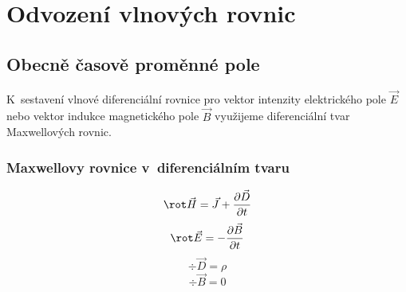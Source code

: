 
\chapter{Odvození vlnových rovnic} \label{kap:Odvozeni_VlnR}
\section{Obecně časově proměnné pole} \label{sec:Odvozeni_CasPole}
K~sestavení vlnové diferenciální rovnice pro vektor intenzity elektrického pole $\vec E$ nebo vektor indukce magnetického pole $\vec B$ využijeme diferenciální tvar Maxwellových rovnic. 
\subsection*{Maxwellovy rovnice v~diferenciálním tvaru}
\begin{equation}
	\rot\vec H = \vec J+\frac{\partial\vec D}{\partial t}
	\label{rce:1MaxwR}
\end{equation}
\begin{equation}
	\rot\vec E = -\frac{\partial\vec B}{\partial t}
	\label{rce:2MaxwR}
\end{equation}
\begin{equation}
	\div\vec D = \rho
	\label{rce:3MaxwR}
\end{equation}
\begin{equation}
	\div\vec B = 0
	\label{rce:4MaxwR}
\end{equation}

